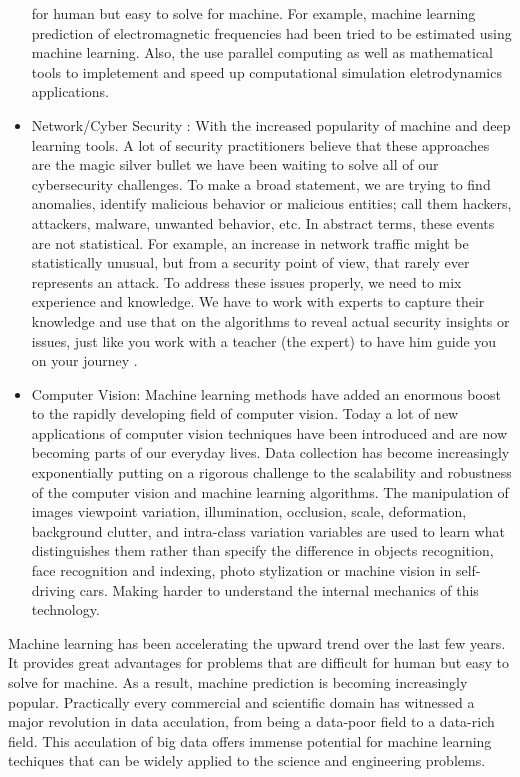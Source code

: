 \documentclass[a4paper, 11pt]{article}
\begin{document}
\begin{small}
\begin{itemize}
for human but easy to solve for machine. For example, machine learning prediction of electromagnetic frequencies had been tried to be estimated using machine learning. 
Also, the use parallel computing as well as mathematical tools to impletement and speed up computational simulation eletrodynamics applications. 
\item Network/Cyber Security :
With the increased popularity of machine and deep learning tools. A lot of security practitioners believe that these approaches are the magic silver bullet we have been waiting
to solve all of our cybersecurity challenges. To make a broad statement, we are trying to find anomalies, identify malicious behavior or malicious entities; call them hackers,
attackers, malware, unwanted behavior, etc.  In abstract terms, these events are not statistical. For example, an increase in network traffic might be statistically unusual,
but from a security point of view, that rarely ever represents an attack.  To address these issues properly, we need to mix experience and knowledge.
We have to work with experts to capture their knowledge and use that on the algorithms to reveal actual security insights or issues, just like you work
with a teacher (the expert) to have him guide you on your journey \cite{ML_cyber_security_Barreno, ML_Application_Network_Detection}.
\item Computer Vision: Machine learning methods have added an enormous boost to the rapidly developing field of computer vision.
Today a lot of new applications of computer vision techniques have been introduced and are now becoming parts of our everyday lives.
Data collection has become increasingly exponentially putting on a rigorous challenge to the scalability and robustness of the computer vision and machine learning algorithms. 
The manipulation of images viewpoint variation,  illumination, occlusion, scale, deformation, background clutter, and intra-class variation variables
are used to learn what distinguishes them rather than specify the difference in objects recognition, face recognition and indexing, photo stylization or machine vision in self-driving cars.
Making harder to understand the internal mechanics of this technology\cite{ML_Computer_Vision}. 
\end{itemize}
Machine learning has been accelerating the upward trend over the last few years. It provides great advantages for problems that are difficult for human but easy to solve for machine.
As a result, machine prediction is becoming increasingly popular.  Practically every commercial and scientific domain has witnessed a major revolution in data acculation, from being 
a data-poor field to a data-rich field. This acculation of big data offers immense potential for machine learning techiques that can be widely applied to the science and engineering problems.


\end{small}
\end{document}
